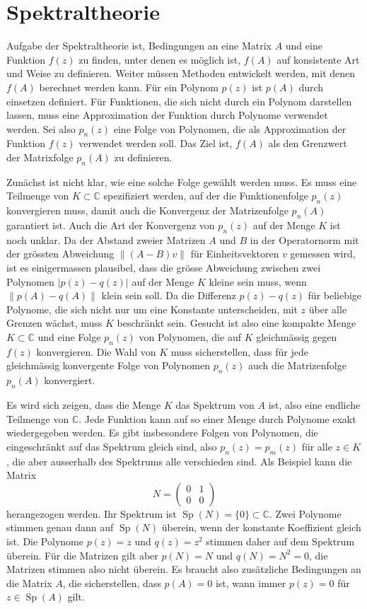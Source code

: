 %
%
% 
\section{Spektraltheorie
\label{buch:section:spektraltheorie}}
Aufgabe der Spektraltheorie ist, Bedingungen an eine Matrix $A$ und eine
Funktion $f(z)$ zu finden, unter denen es möglich ist, $f(A)$ auf 
konsistente Art und Weise zu definieren.
Weiter müssen Methoden entwickelt werden, mit denen $f(A)$ berechnet
werden kann.
Für ein Polynom $p(z)$ ist $p(A)$ durch einsetzen definiert.
Für Funktionen, die sich nicht durch ein Polynom darstellen lassen,
muss eine Approximation der Funktion durch Polynome verwendet werden.
Sei also $p_n(z)$ eine Folge von Polynomen, die als Approximation der
Funktion $f(z)$ verwendet werden soll.
Das Ziel ist, $f(A)$ als den Grenzwert der Matrixfolge $p_n(A)$
zu definieren.

Zunächst ist nicht klar, wie eine solche Folge gewählt werden muss.
Es muss eine Teilmenge von $K\subset\mathbb{C}$ spezifiziert werden,
auf der die Funktionenfolge $p_n(z)$ konvergieren muss,
damit auch die Konvergenz der Matrizenfolge $p_n(A)$ garantiert ist.
Auch die Art der Konvergenz von $p_n(z)$ auf der Menge $K$ ist noch
unklar.
Da der Abstand zweier Matrizen $A$ und $B$ in der Operatornorm
mit der grössten Abweichung $\|(A-B)v\|$ für Einheitsvektoren $v$
gemessen wird, ist es einigermassen plausibel, dass
die grösse Abweichung zwischen zwei Polynomen $|p(z) - q(z)|$ auf
der Menge $K$ kleine sein muss, wenn $\|p(A)-q(A)\|$ klein 
sein soll.
Da die Differenz $p(z)-q(z)$ für beliebige Polynome, die sich nicht
nur um eine Konstante unterscheiden, mit $z$ über alle Grenzen wächst,
muss $K$ beschränkt sein.
Gesucht ist also eine kompakte Menge $K\subset\mathbb{C}$ und eine
Folge $p_n(z)$ von Polynomen, die auf $K$ gleichmässig gegen $f(z)$
konvergieren.
Die Wahl von $K$ muss sicherstellen, dass für jede gleichmässig
konvergente Folge von Polynomen $p_n(z)$ auch die Matrizenfolge
$p_n(A)$ konvergiert.

Es wird sich zeigen, dass die Menge $K$ das Spektrum von $A$ ist,
also eine endliche Teilmenge von $\mathbb{C}$.
Jede Funktion kann auf so einer Menge durch Polynome exakt wiedergegeben
werden.
Es gibt insbesondere Folgen von Polynomen, die eingeschränkt
auf das Spektrum gleich sind, also $p_n(z)=p_m(z)$ für alle $z\in K$,
die aber ausserhalb des Spektrums alle verschieden sind.
Als Beispiel kann die Matrix 
\[
N=\begin{pmatrix}0&1\\0&0\end{pmatrix}
\]
herangezogen werden.
Ihr Spektrum ist $\operatorname{Sp}(N)=\{0\}\subset\mathbb{C}$.
Zwei Polynome stimmen genau dann auf $\operatorname{Sp}(N)$ überein,
wenn der konstante Koeffizient gleich ist.
Die Polynome $p(z)=z$ und $q(z)=z^2$ stimmen daher auf dem Spektrum
überein.
Für die Matrizen gilt aber $p(N)=N$ und $q(N)=N^2=0$, die Matrizen
stimmen also nicht überein.
Es braucht also zusätzliche Bedingungen an die Matrix $A$, die
sicherstellen, dass $p(A)=0$ ist, wann immer $p(z)=0$ für
$z\in\operatorname{Sp}(A)$ gilt.

